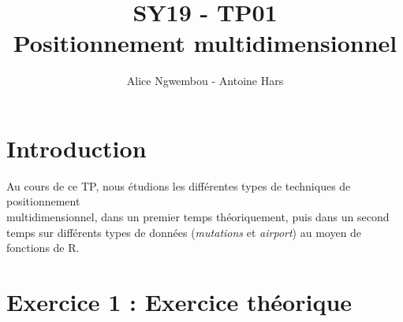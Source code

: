 \documentclass[a4paper, 10pt]{article}
\title{SY19 - TP01\\Positionnement multidimensionnel}
\author{Alice Ngwembou - Antoine Hars}
\begin{document}
\maketitle

\section*{Introduction}
Au cours de ce TP, nous étudions les différentes types de techniques de positionnement\\multidimensionnel, dans un premier temps théoriquement,
puis dans un second temps sur différents types de données (\textit{mutations} et \textit{airport}) au moyen de fonctions de R.

\section*{Exercice 1 : Exercice théorique}
\end{document}
